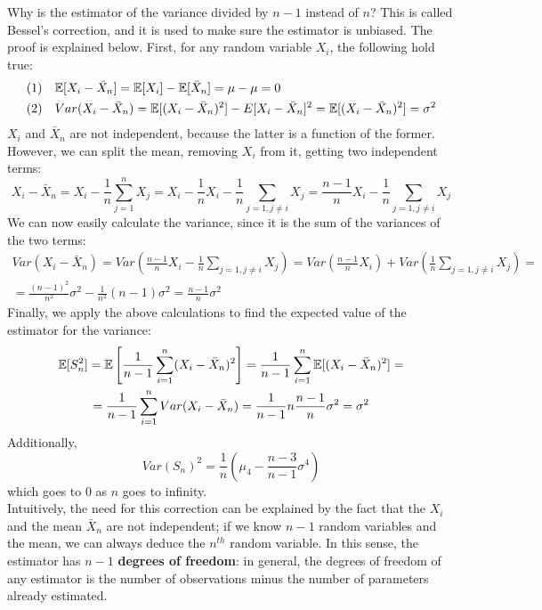 Why is the estimator of the variance divided by $n-1$ instead of $n$? This is called Bessel's correction, and it is used to make sure the estimator is unbiased. The proof is explained below. First, for any random variable $X_i$, the following hold true:
\begin{align*}
    &(1)\quad \mathbb{E}[X_i - \bar{X}_n] = \mathbb{E}[X_i] - \mathbb{E}[\bar{X}_n] = \mu - \mu = 0 \\
    &(2)\quad Var(X_i - \bar{X}_n) = \mathbb{E}[(X_i - \bar{X}_n)^2] - E[X_i - \bar{X}_n]^2 = \mathbb{E}[(X_i - \bar{X}_n)^2] = \sigma^2
\end{align*}
$X_i$ and $\bar{X}_n$ are not independent, because the latter is a function of the former. However, we can split the mean, removing $X_i$ from it, getting two independent terms:
\begin{equation*}
    X_i - \bar{X}_n = X_i - \frac{1}{n} \sum_{j=1}^n X_j = X_i - \frac{1}{n} X_i - \frac{1}{n} \sum_{j=1, j \not = i} X_j = \frac{n - 1}{n} X_i - \frac{1}{n} \sum_{j=1, j \not = i} X_j
\end{equation*}   
We can now easily calculate the variance, since it is the sum of the variances of the two terms:
\begin{gather*}
    Var(X_i - \bar{X}_n) = Var\left(\frac{n - 1}{n} X_i - \frac{1}{n} \sum_{j=1, j \not = i} X_j\right) = Var\left(\frac{n - 1}{n} X_i\right) + Var\left(\frac{1}{n} \sum_{j=1, j \not = i} X_j\right) =\\
    = \frac{(n - 1)^2}{n^2} \sigma^2 - \frac{1}{n^2} (n-1) \sigma^2 = \frac{n-1}{n} \sigma^2
\end{gather*}
Finally, we apply the above calculations to find the expected value of the estimator for the variance:
\begin{gather*}
    \mathbb{E}[S_n^2] = \mathbb{E}\left[\frac{1}{n-1} \sum_{i=1}^n (X_i - \bar{X}_n)^2\right] = \frac{1}{n-1} \sum_{i=1}^n \mathbb{E}[(X_i - \bar{X}_n)^2] =\\
    = \frac{1}{n-1} \sum_{i=1}^n Var(X_i - \bar{X}_n) = \frac{1}{n-1} n \frac{n-1}{n} \sigma^2 = \sigma^2
\end{gather*}
Additionally,
\begin{equation*}
    Var(S_n)^2 = \frac{1}{n}(\mu_4 - \frac{n-3}{n-1}\sigma^4)
\end{equation*}   
which goes to 0 as $n$ goes to infinity.\\
Intuitively, the need for this correction can be explained by the fact that the $X_i$ and the mean $\bar{X}_n$ are not independent; if we know $n-1$ random variables and the mean, we can always deduce the $n^{th}$ random variable. In this sense, the estimator has $n-1$ \textbf{degrees of freedom}: in general, the degrees of freedom of any estimator is the number of observations minus the number of parameters already estimated.

